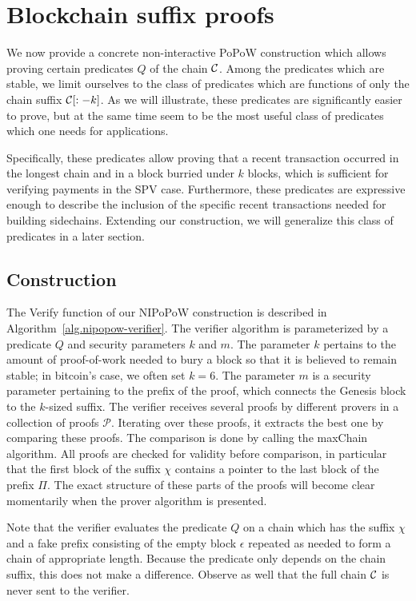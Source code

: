 \section{Blockchain suffix proofs}

We now provide a concrete non-interactive PoPoW construction which allows
proving certain predicates $Q$ of the chain $\mathcal{C}$. Among the predicates
which are stable, we limit ourselves to the class of predicates which are
functions of only the chain suffix $\mathcal{C}[:-k]$. As we will illustrate, these
predicates are significantly easier to prove, but at the same time seem to be
the most useful class of predicates which one needs for applications.

Specifically, these predicates allow proving that a recent transaction occurred
in the longest chain and in a block burried under $k$ blocks, which is
sufficient for verifying payments in the SPV case. Furthermore, these
predicates are expressive enough to describe the inclusion of the specific
recent transactions needed for building sidechains. Extending our construction,
we will generalize this class of predicates in a later section.

\subsection{Construction}

The \textsf{Verify} function of our NIPoPoW construction is described in
Algorithm~\ref{alg.nipopow-verifier}. The verifier algorithm is parameterized
by a predicate $Q$ and security parameters $k$ and $m$. The parameter $k$
pertains to the amount of proof-of-work needed to bury a block so that it is
believed to remain stable; in bitcoin's case, we often set $k = 6$. The
parameter $m$ is a security parameter pertaining to the prefix of the proof,
which connects the Genesis block to the $k$-sized suffix.  The verifier
receives several proofs by different provers in a collection of proofs
$\mathcal{P}$. Iterating over these proofs, it extracts the best one by
comparing these proofs. The comparison is done by calling the maxChain
algorithm. All proofs are checked for validity before comparison, in particular
that the first block of the suffix $\chi$ contains a pointer to the last block
of the prefix $\Pi$. The exact structure of these parts of the proofs will
become clear momentarily when the prover algorithm is presented.

Note that the verifier evaluates the predicate $Q$ on a chain which has the
suffix $\chi$ and a fake prefix consisting of the empty block $\epsilon$
repeated as needed to form a chain of appropriate length. Because the predicate
only depends on the chain suffix, this does not make a difference. Observe as
well that the full chain $\mathcal{C}$ is never sent to the verifier.

